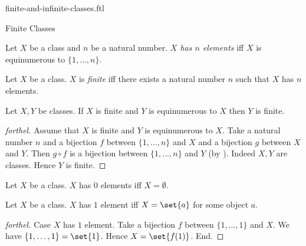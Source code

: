 \documentclass{naproche-library}
\begin{document}
\begin{smodule}[title=Finite and Infinite Classes]{finite-and-infinite-classes.ftl}

\begin{sfragment}{Finite Classes}
  \begin{definition}[forthel,id=FOUNDATIONS_14_3512046897512410]
    Let $X$ be a class and $n$ be a natural number.
    \emph{$X$ has $n$ elements} iff $X$ is equinumerous to $\{ 1, \dots, n \}$.
  \end{definition}

  \begin{definition}[forthel,id=FOUNDATIONS_14_3694156977274880]
    Let $X$ be a class.
    $X$ is \emph{finite} iff there exists a natural number $n$ such that $X$ has $n$ elements.
  \end{definition}

  \begin{proposition}[forthel,id=FOUNDATIONS_14_3929085203972096]
    Let $X, Y$ be classes.
    If $X$ is finite and $Y$ is equinumerous to $X$ then $Y$ is finite.
  \end{proposition}
  \begin{proof}[forthel]
    Assume that $X$ is finite and $Y$ is equinumerous to $X$.
    Take a natural number $n$ and a bijection $f$ between $\{ 1, \dots, n \}$ and $X$ and a bijection $g$ between $X$ and $Y$.
    Then $g \circ f$ is a bijection between $\{ 1, \dots, n \}$ and $Y$ (by ).
    Indeed $X, Y$ are classes.
    Hence $Y$ is finite.
  \end{proof}

  \begin{proposition}[forthel,id=FOUNDATIONS_14_5132547854597502]
    Let $X$ be a class.
    $X$ has $0$ elements iff $X = \emptyset$.
  \end{proposition}

  \begin{proposition}[forthel,id=FOUNDATIONS_14_6812054297034125]
    Let $X$ be a class.
    $X$ has $1$ element iff $X = \set{a}$ for some object $a$.
  \end{proposition}
  \begin{proof}[forthel]
    Case $X$ has $1$ element.
      Take a bijection $f$ between $\{ 1, \dots, 1 \}$ and $X$.
      We have $\{ 1, \dots, 1 \} = \set{1}$.
      Hence $X = \set{f(1)}$.
    End.


\end{proof}
\end{sfragment}
\end{smodule}
\end{document}
